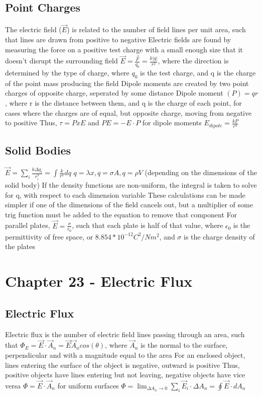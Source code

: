\documentclass[11 pt, twoside]{article}
\newenvironment{outline*}
{
	\begin{outline}[enumerate]
	}
	{\end{outline}
}
\begin{document}
\subsection{Point Charges}
\begin{outline*}
\1 The electric field ($\vec{E}$) is related to the number of field lines per unit area, such that lines are drawn from positive to negative
\2 Electric fields are found by measuring the force on a positive test charge with a small enough size that it doesn't disrupt the surrounding field
\2 $\vec{E} = \frac{\vec{F}}{q_0} = \frac{k|q|}{r^2}$, where the direction is determined by the type of charge, where $q_0$ is the test charge, and q is the charge of the point mass producing the field
\1 Dipole moments are created by two point charges of opposite charge, seperated by some distance
\2 Dipole moment $(P) = qr$, where r is the distance between them, and q is the charge of each point, for cases where the charges are of equal, but opposite charge, moving from negative to positive
\2 Thus, $\tau = P x E$ and $PE = -E \cdot P$ for dipole moments
\2 $E_{dipole} = \frac{kP}{r^3}$
\end{outline*}
\subsection{Solid Bodies}
\begin{outline*}
\1 $\vec{E} = \sum_i \frac{k\Delta q_i}{r_i^2} = \int \frac{k}{r^2}dq$
\2 $q = \lambda x, q = \sigma A, q = \rho V$ (depending on the dimensions of the solid body)
\2 If the density functions are non-uniform, the integral is taken to solve for q, with respect to each dimension variable 
\1 These calculations can be made simpler if one of the dimensions of the field cancels out, but a multiplier of some trig function must be added to the equation to remove that component
\1 For parallel plates, $\vec{E} = \frac{\sigma}{\epsilon_0}$, such that each plate is half of that value, where $\epsilon_0$ is the permittivity of free space, or $8.854 * 10^{-12} C^2/Nm^2$, and $\sigma$ is the charge density of the plates
\end{outline*}

\section{Chapter 23 - Electric Flux}
\subsection{Electric Flux}
\begin{outline*}
\1 Electric flux is the number of electric field lines passing through an area, such that $\Phi_E = \vec{E} \cdot \vec{A}_n = \vec{E}\vec{A}_ncos(\theta)$, where $\vec{A}_n$ is the normal to the surface, perpendicular and with a magnitude equal to the area
\2 For an enclosed object, lines entering the surface of the object is negative, outward is positive
\2 Thus, positive objects have lines entering but not leaving, negative objects have vice versa 
\1 $\Phi = \vec{E} \cdot \vec{A}_n$ for uniform surfaces
\2 $\Phi = \lim_{\Delta A_n \to 0} \sum_i \vec{E}_i \cdot \Delta A_n = \oint \vec{E} \cdot dA_n$
\end{outline*}
\end{document}
